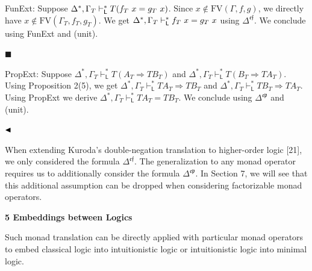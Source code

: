 \documentclass[10pt,a4paper]{article}
\begin{document}
FunExt: Suppose $\Delta^{*},\Gamma_{T}\vdash_{\mathsf{L}}^{*}T(f_{T}\leavevmode\nobreak\ x=g_{T}\leavevmode\nobreak\ x)$. Since $x\notin\text{{FV}}(\Gamma,f,g)$, we directly have $x\notin\text{{FV}}(\Gamma_{T},f_{T},g_{T})$. We get $\Delta^{*},\Gamma_{T}\vdash_{\mathsf{L}}^{*}f_{T}\leavevmode\nobreak\ x=g_{T}\leavevmode\nobreak\ x$ using $\Delta^{\mathfrak{e}\mathfrak{f}}$. We conclude using FunExt and (unit).\par
 
 
 
\par\noindent  $\blacksquare$ 
 
PropExt: Suppose $\Delta^{*},\Gamma_{T}\vdash_{\mathsf{L}}^{*}T(A_{T}\mathbin{\Rightarrow}TB_{T})$ and $\Delta^{*},\Gamma_{T}\vdash_{\mathsf{L}}^{*}T(B_{T}\mathbin{\Rightarrow}TA_{T})$. Using Proposition 2(5), we get $\Delta^{*},\Gamma_{T}\vdash_{\mathsf{L}}^{*}TA_{T}\mathbin{\Rightarrow}TB_{T}$ and $\Delta^{*},\Gamma_{T}\vdash_{\mathsf{L}}^{*}TB_{T}\mathbin{\Rightarrow}TA_{T}$. Using PropExt we derive $\Delta^{*},\Gamma_{T}\vdash_{\mathsf{L}}^{*}TA_{T}=TB_{T}$. We conclude using $\Delta^{\mathfrak{e}\mathfrak{p}}$ and (unit).\par
 
 
  
$\hfill\blacktriangleleft$\par
 
 
 
When extending Kuroda’s double-negation translation to higher-order logic [21], we only considered the formula $\Delta^{\mathfrak{e}\mathfrak{f}}$. The generalization to any monad operator requires us to additionally consider the formula $\Delta^{\mathfrak{e}\mathfrak{p}}$. In Section 7, we will see that this additional assumption can be dropped when considering factorizable monad operators.\par
 
 
 


 
\par\medskip\noindent\textbf{5 Embeddings between Logics}\par
 
 
Such monad translation can be directly applied with particular monad operators to embed classical logic into intuitionistic logic or intuitionistic logic into minimal logic.\par
 
\end{document}
